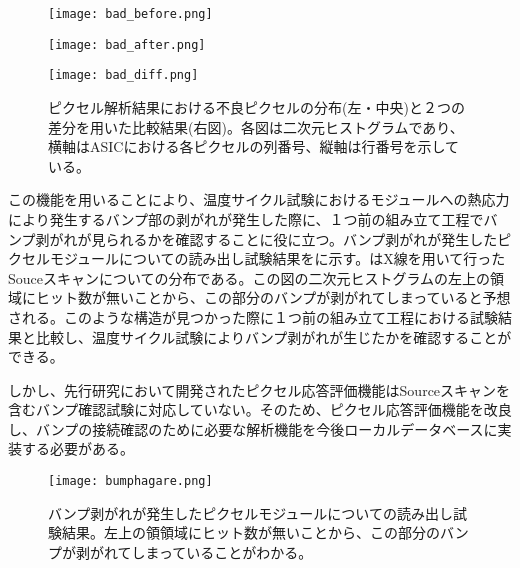 \begin{figure}[tbp]
 \begin{minipage}{0.33\hsize}
  \begin{center}
   \texttt{[image: bad\_before.png]}
  \end{center}
 \end{minipage}
 \begin{minipage}{0.33\hsize}
 \begin{center}
  \texttt{[image: bad\_after.png]}
 \end{center}
 \end{minipage}
 \begin{minipage}{0.33\hsize}
 \begin{center}
  \texttt{[image: bad\_diff.png]}
 \end{center}
 \end{minipage}
 \caption[ピクセル解析結果における不良ピクセルの分布と２つの差分を用いた比較結果]{ピクセル解析結果における不良ピクセルの分布(左・中央)と２つの差分を用いた比較結果(右図)。各図は二次元ヒストグラムであり、横軸はASICにおける各ピクセルの列番号、縦軸は行番号を示している。}
 \label{fig:badpixel}
\end{figure}

この機能を用いることにより、温度サイクル試験におけるモジュールへの熱応力により発生するバンプ部の剥がれが発生した際に、１つ前の組み立て工程でバンプ剥がれが見られるかを確認することに役に立つ。バンプ剥がれが発生したピクセルモジュールについての読み出し試験結果をに示す。はX線を用いて行ったSouceスキャンについての分布である。この図の二次元ヒストグラムの左上の領域にヒット数が無いことから、この部分のバンプが剥がれてしまっていると予想される。このような構造が見つかった際に１つ前の組み立て工程における試験結果と比較し、温度サイクル試験によりバンプ剥がれが生じたかを確認することができる。

しかし、先行研究において開発されたピクセル応答評価機能はSourceスキャンを含むバンプ確認試験に対応していない。そのため、ピクセル応答評価機能を改良し、バンプの接続確認のために必要な解析機能を今後ローカルデータベースに実装する必要がある。


\begin{figure}[tbp]
  \centering
  \texttt{[image: bumphagare.png]}
  \caption[バンプ剥がれが発生したピクセルモジュールについての読み出し試験結果]{バンプ剥がれが発生したピクセルモジュールについての読み出し試験結果。左上の領領域にヒット数が無いことから、この部分のバンプが剥がれてしまっていることがわかる。}
  \label{fig:bumphagare}
\end{figure}



